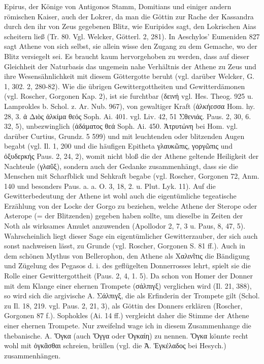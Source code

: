 \documentclass[a4paper, 11pt, oneside]{article}
\begin{document}
Epirus, der Könige von Antigonos Stamm, Domitians und einiger andern römischen Kaiser, auch der Lokrer, da man die Göttin zur Rache der Kassandra durch den ihr von Zeus gegebenen Blitz, wie Euripides sagt, den Lokrischen Aias scheitern ließ (Tr. 80. Vgl. Welcker, Götterl. 2, 281). In Aeschylos' Eumeniden 827 sagt Athene von sich selbst, sie allein wisse den Zugang zu dem Gemache, wo der Blitz versiegelt sei. Es braucht kaum hervorgehoben zu werden, dass auf dieser Gleichheit der Naturbasis das ungemein nahe Verhältnis der Athene zu Zeus und ihre Wesensähnlichkeit mit diesem Göttergotte beruht (vgl. darüber Welcker, G. 1, 302. 2, 280-82). Wie die übrigen Gewittergottheiten und Gewitterdämonen (vgl. Roscher, Gorgonen Kap. 2), ist sie furchtbar (δεινή vgl. Hes. Theog. 925 u. Lamprokles b. Schol. z. Ar. Nub. 967), von gewaltiger Kraft (ἀλκήεσσα Hom. hy. 28, 3. ἁ Διὸς ἀλκίμα θεός Soph. Ai. 401. vgl. Liv. 42, 51 Σθενιάς. Paus. 2, 30, 6. 32, 5), unbezwinglich (ἀδάματος θεά Soph. Ai. 450. Ἀτρυτώνη bei Hom. vgl. darüber Curtius, Grundz. 5 599) und mit leuchtenden oder blitzenden Augen begabt (vgl. Il. 1, 200 und die häufigen Epitheta γλαυκῶπις, γοργῶπις und ὀξυδερκής Paus. 2, 24, 2), womit nicht bloß die der Athene geltende Heiligkeit der Nachteule (γλαῦξ), sondern auch der Gedanke zusammenhängt, dass sie die Menschen mit Scharfblick und Sehkraft begabe (vgl. Roscher, Gorgonen 72, Anm. 140 und besonders Paus. a. a. O. 3, 18, 2. u. Plut. Lyk. 11). Auf die Gewitterbedeutung der Athene ist wohl auch die eigentümliche tegeatische Erzählung von der Locke der Gorgo zu beziehen, welche Athene der Sterope oder Asterope (= der Blitzenden) gegeben haben sollte, um dieselbe in Zeiten der Noth als wirksames Amulet anzuwenden (Apollodor 2, 7, 3 u. Paus, 8, 47, 5). Wahrscheinlich liegt dieser Sage ein eigentümlicher Gewitterzauber, der sich auch sonst nachweisen lässt, zu Grunde (vgl. Roscher, Gorgonen S. 81 ff.). Auch in dem schönen Mythus von Bellerophon, den Athene als Χαλινῖτις die Bändigung und Zügelung des Pegasos d. i. des geflügelten Donnerrosses lehrt, spielt sie die Rolle einer Gewittergottheit (Paus. 2, 4, 1. 5). Da schon von Homer der Donner mit dem Klange einer ehernen Trompete (σάλπιγξ) verglichen wird (Il. 21, 388), so wird sich die argivische A. Σάλπιγξ, die als Erfinderin der Trompete gilt (Schol. zu Il. 18, 219. vgl. Paus. 2, 21, 3), als Göttin des Donners erklären (Roscher, Gorgonen 87 f.). Sophokles (Ai. 14 ff.) vergleicht daher die Stimme der Athene einer ehernen Trompete. Nur zweifelnd wage ich in diesem Zusammenhange die thebanische. A. Ὄγκα (auch Ὄγγα oder Ὀγκαίη) zu nennen. Ὄγκα könnte recht wohl mit ὀγκᾶσθαι schreien, brüllen (vgl. die Ἀ. Ἐγκέλαδος bei Hesych.) zusammenhängen.
\end{document}
